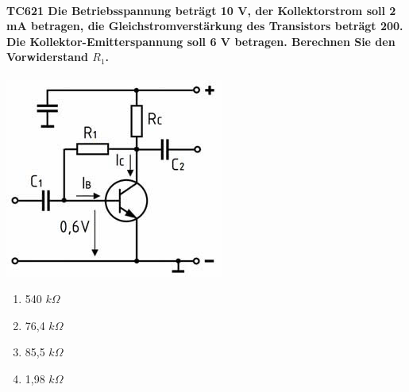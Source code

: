 \documentclass[8pt]{article}
\begin{document}
\begin{enumerate}
\begin{enumerate}[nolistsep,label=\Alph*]
{\begin{enumerate}[nolistsep,label=\Alph*]
\paragraph*{TC621 Die Betriebsspannung beträgt 10 V, der Kollektorstrom soll 2 mA betragen, die Gleichstromverstärkung des Transistors beträgt 200. Die Kollektor-Emitterspannung soll 6 V betragen. Berechnen Sie den Vorwiderstand $R_{1}$.}
\begin{center}
	\begin{minipage}{\linewidth}
		\centering
		\includegraphics[scale=1.0]{pics/tc621_a.jpg}
	\end{minipage}
\end{center}
\begin{enumerate}[nolistsep,label=\Alph*]
\item 540 $k\Omega$
\item 76,4 $k\Omega$
\item 85,5 $k\Omega$
\item 1,98 $k\Omega$
\end{enumerate}


\end{enumerate}}
\end{enumerate}
\end{enumerate}
\end{document}

